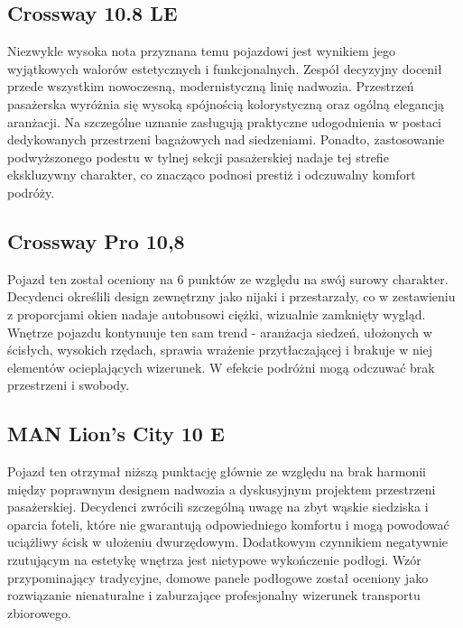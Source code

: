 \subsection{Crossway 10.8 LE}
Niezwykle wysoka nota przyznana temu pojazdowi jest wynikiem jego wyjątkowych walorów estetycznych i funkcjonalnych. Zespół decyzyjny docenił przede wszystkim nowoczesną, modernistyczną linię nadwozia. Przestrzeń pasażerska wyróżnia się wysoką spójnością kolorystyczną oraz ogólną elegancją aranżacji. Na szczególne uznanie zasługują praktyczne udogodnienia w postaci dedykowanych przestrzeni bagażowych nad siedzeniami. Ponadto, zastosowanie podwyższonego podestu w tylnej sekcji pasażerskiej nadaje tej strefie ekskluzywny charakter, co znacząco podnosi prestiż i odczuwalny komfort podróży.

\subsection{Crossway Pro 10,8}
Pojazd ten został oceniony na 6 punktów ze względu na swój surowy charakter. Decydenci określili design zewnętrzny jako nijaki i przestarzały, co w zestawieniu z proporcjami okien nadaje autobusowi ciężki, wizualnie zamknięty wygląd. Wnętrze pojazdu kontynuuje ten sam trend - aranżacja siedzeń, ułożonych w ścisłych, wysokich rzędach, sprawia wrażenie przytłaczającej i brakuje w niej elementów ocieplających wizerunek. W efekcie podróżni mogą odczuwać brak przestrzeni i swobody.

\subsection{MAN Lion's City 10 E}
Pojazd ten otrzymał niższą punktację głównie ze względu na brak harmonii między poprawnym designem nadwozia a dyskusyjnym projektem przestrzeni pasażerskiej. Decydenci zwrócili szczególną uwagę na zbyt wąskie siedziska i oparcia foteli, które nie gwarantują odpowiedniego komfortu i mogą powodować uciążliwy ścisk w ułożeniu dwurzędowym. Dodatkowym czynnikiem negatywnie rzutującym na estetykę wnętrza jest nietypowe wykończenie podłogi. Wzór przypominający tradycyjne, domowe panele podłogowe został oceniony jako rozwiązanie nienaturalne i zaburzające profesjonalny wizerunek transportu zbiorowego.

